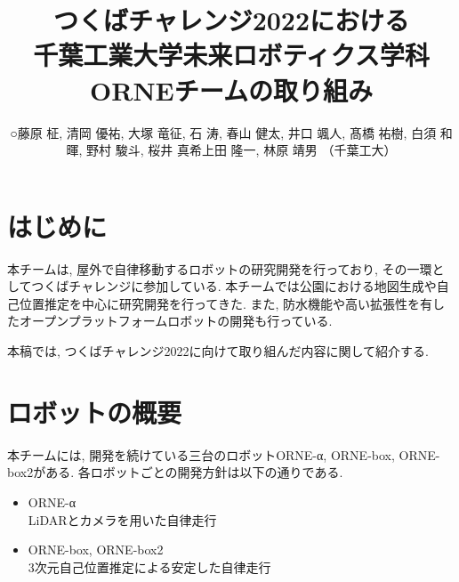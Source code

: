\documentclass[uplatex, twocolumn, 9pt]{jsproceedings}
\title{つくばチャレンジ2022における\\千葉工業大学未来ロボティクス学科ORNEチームの取り組み}
\author{○藤原 柾, 清岡 優祐, 大塚 竜征, 石 涛, 春山 健太, 井口 颯人, 髙橋 祐樹, 白須 和暉, 野村 駿斗, 桜井 真希\newline 上田 隆一, 林原 靖男 （千葉工大）}
\affiliation{千葉工業大学未来ロボティクス学科}
\begin{document}
\maketitle


\section{はじめに}

本チームは, 屋外で自律移動するロボットの研究開発を行っており, その一環としてつくばチャレンジに参加している. 本チームでは公園における地図生成や自己位置推定を中心に研究開発を行ってきた. また, 防水機能や高い拡張性を有したオープンプラットフォームロボットの開発も行っている. 

本稿では, 
つくばチャレンジ2022に向けて取り組んだ内容に関して紹介する.

\section{ロボットの概要}
本チームには, 開発を続けている三台のロボットORNE-α, ORNE-box\cite{si-box}, ORNE-box2がある. 各ロボットごとの開発方針は以下の通りである. 
\begin{itemize}
  \item ORNE-α\\LiDARとカメラを用いた自律走行
  \item ORNE-box, ORNE-box2\\3次元自己位置推定による安定した自律走行
\end{itemize}
\end{document}
